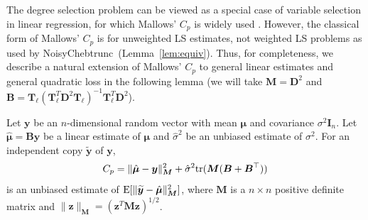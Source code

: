 \documentclass[final,onefignum,onetabnum]{siamart220329}
\def\mainalg{NoisyChebtrunc}
\newcommand{\vct}[1]{\bm{#1}}
\newcommand{\mtx}[1]{\bm{#1}}
\begin{document}
The degree selection problem can be viewed as a special case of variable selection in linear regression, for which Mallows' $C_p$ is widely used \cite{james2013introduction,mallows2000some}.
However, the classical form of Mallows' $C_p$ is for unweighted LS estimates, not weighted LS problems as used by \mainalg\ (Lemma~\ref{lem:equiv}).
Thus, for completeness, we describe a natural extension of Mallows' $C_p$ to general linear estimates and general quadratic loss in the following lemma {(we will take $\mtx{M}=\mtx{D}^2$ and $\mtx{B}=\mtx{T}_{\ell} (\mtx{T}_{\ell}^T \mtx{D}^2 \mtx{T}_{\ell})^{-1} \mtx{T}_{\ell}^T \mtx{D}^2$)}. 

\begin{lemma}\label{lem_Cp}
	Let $\vct{y}$ be an $n$-dimensional random vector with mean $\vct{\mu}$ and covariance $\sigma^2 \mtx{I}_n$.
	Let $\hat{\vct{\mu}}=\mtx{B} \vct{y}$ be a linear estimate of $\vct{\mu}$ and $\hat{\sigma}^2$ be an unbiased estimate of $\sigma^2$.
	For an independent copy $\widetilde{\vct{y}}$ of $\vct{y}$, 
	\begin{align*}
		C_p = \| \hat{\vct{\mu}}-\vct{y} \|_{\mtx{M}}^2 + \hat{\sigma}^2 {\rm tr} (\mtx{M} (\mtx{B}+\mtx{B}^{\top}))
	\end{align*}
	is an unbiased estimate of ${\rm E} [ \| \widetilde{\vct{y}}-\hat{\vct{\mu}} \|_{\mtx{M}}^2]$, where $\mtx{M}$ is a $n \times n$ positive definite matrix and $\| \vct{z} \|_{\mtx{M}} = (\vct{z}^T \mtx{M} \vct{z})^{1/2}$.
\end{lemma}
\end{document}
